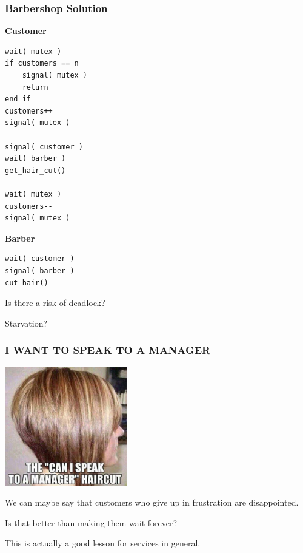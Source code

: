 \begin{frame}[fragile]
	\frametitle{Barbershop Solution}

	\begin{multicols}{2}
		\textbf{Customer}
		\begin{lstlisting}
wait( mutex )
if customers == n
    signal( mutex )
    return
end if
customers++
signal( mutex )

signal( customer )
wait( barber )
get_hair_cut()

wait( mutex )
customers--
signal( mutex )
\end{lstlisting}
		\columnbreak
		\textbf{Barber}
		\begin{lstlisting}
wait( customer )
signal( barber )
cut_hair()
  \end{lstlisting}
	\end{multicols}

	Is there a risk of deadlock?

	Starvation?

\end{frame}


\begin{frame}
	\frametitle{I WANT TO SPEAK TO A MANAGER}
	
	\begin{center}
	\includegraphics[width=0.4\textwidth]{images/manager.jpg}
	\end{center}

	We can maybe say that customers who give up in frustration are disappointed.

	Is that better than making them wait forever?

	This is actually a good lesson for services in general.

\end{frame}



